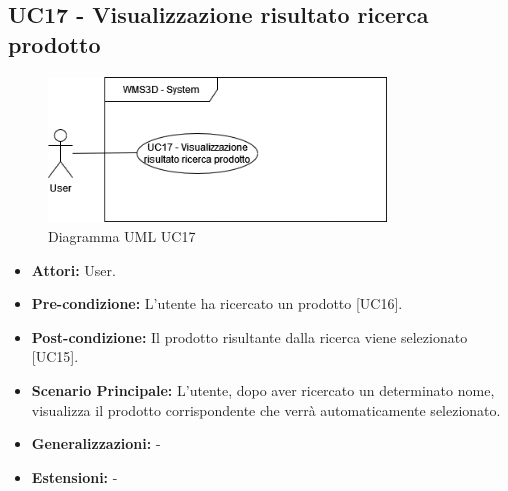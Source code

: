 \subsection{UC17 - Visualizzazione risultato ricerca prodotto}
\begin{figure}[H]
  \centering
  \includegraphics[width=0.8\textwidth]{UC_diagrams_11-20/UC17.drawio.png}
   \caption{Diagramma UML UC17}
\end{figure}
\begin{itemize}
    \item \textbf{Attori:} User.
    \item \textbf{Pre-condizione:} L'utente ha ricercato un prodotto [UC16].
    \item \textbf{Post-condizione:} Il prodotto risultante dalla ricerca viene selezionato [UC15].
    \item \textbf{Scenario Principale:} L'utente, dopo aver ricercato un determinato nome, visualizza il prodotto corrispondente che verrà automaticamente selezionato.
    \item \textbf{Generalizzazioni:} -
    \item \textbf{Estensioni:} -
\end{itemize}